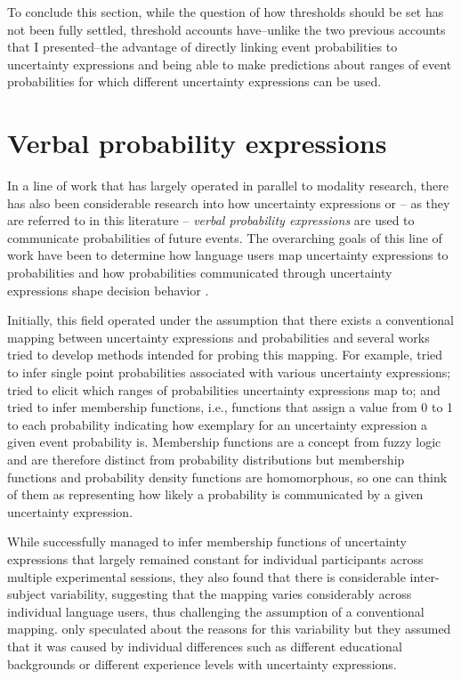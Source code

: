 To conclude this section, while the question of how thresholds should be set has not been fully settled, threshold accounts have--unlike the two previous accounts that I presented--the 
advantage of directly linking event probabilities to uncertainty expressions and being able to make predictions about ranges of event probabilities for which different
uncertainty expressions can be used.

\section{Verbal probability expressions}

In a line of work that has largely operated in parallel to modality research, there has also been considerable research 
into how uncertainty expressions or -- as they are referred to in this literature -- \textit{verbal probability expressions} are used
to communicate probabilities of future events. The overarching goals of this line of work have been to determine how
language users map uncertainty expressions to probabilities and how probabilities communicated through uncertainty expressions
shape decision behavior \cite{Budescu1995}. 

Initially, this field operated under the assumption that there exists a conventional mapping between uncertainty expressions
and probabilities and several works tried to develop methods intended for probing this mapping. For example, \textcite{BeythMarom1982} 
tried to infer single point probabilities associated with various uncertainty expressions; \textcite{Hamm1991} tried to elicit which ranges of
probabilities uncertainty expressions map to; and \textcite{Wallsten1986} tried to infer membership functions, i.e., 
functions that assign a value from 0 to 1 to each probability indicating how exemplary for an uncertainty expression a given
event probability is. Membership functions are a concept from fuzzy logic and are therefore distinct from probability distributions but 
 membership functions and probability density functions are homomorphous, so one can think of them as representing how likely a 
probability is communicated by a given uncertainty expression.

While \textcite{Wallsten1986} successfully managed to infer membership functions of uncertainty expressions
that largely remained constant for individual participants across multiple experimental sessions, they also found that there is considerable
inter-subject variability, suggesting that the mapping varies considerably across individual language users, thus challenging
the assumption of a conventional mapping. \textcite{Wallsten1986} only speculated about the reasons 
for this variability but they assumed that it was caused by individual differences such as different educational backgrounds
or different experience levels with uncertainty expressions.

